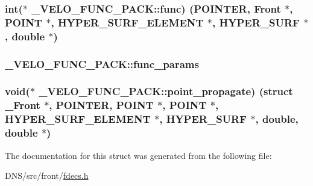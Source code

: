 \subsubsection[{\texorpdfstring{func}{func}}]{\setlength{\rightskip}{0pt plus 5cm}int($\ast$ \+\_\+\+V\+E\+L\+O\+\_\+\+F\+U\+N\+C\+\_\+\+P\+A\+C\+K\+::func) ({\bf P\+O\+I\+N\+T\+ER}, {\bf Front} $\ast$, {\bf P\+O\+I\+NT} $\ast$, {\bf H\+Y\+P\+E\+R\+\_\+\+S\+U\+R\+F\+\_\+\+E\+L\+E\+M\+E\+NT} $\ast$, {\bf H\+Y\+P\+E\+R\+\_\+\+S\+U\+RF} $\ast$, double $\ast$)}\hypertarget{struct___v_e_l_o___f_u_n_c___p_a_c_k_a6c439631360f812cfd623b2e4669c785}{}\label{struct___v_e_l_o___f_u_n_c___p_a_c_k_a6c439631360f812cfd623b2e4669c785}
\subsubsection[{\texorpdfstring{func\+\_\+params}{func_params}}]{ \+\_\+\+V\+E\+L\+O\+\_\+\+F\+U\+N\+C\+\_\+\+P\+A\+C\+K\+::func\+\_\+params}\hypertarget{struct___v_e_l_o___f_u_n_c___p_a_c_k_a47fdc170d348b8a0e417d182c31ad2b4}{}\label{struct___v_e_l_o___f_u_n_c___p_a_c_k_a47fdc170d348b8a0e417d182c31ad2b4}
\subsubsection[{\texorpdfstring{point\+\_\+propagate}{point_propagate}}]{\setlength{\rightskip}{0pt plus 5cm}void($\ast$ \+\_\+\+V\+E\+L\+O\+\_\+\+F\+U\+N\+C\+\_\+\+P\+A\+C\+K\+::point\+\_\+propagate) (struct {\bf \+\_\+\+Front} $\ast$, {\bf P\+O\+I\+N\+T\+ER}, {\bf P\+O\+I\+NT} $\ast$, {\bf P\+O\+I\+NT} $\ast$, {\bf H\+Y\+P\+E\+R\+\_\+\+S\+U\+R\+F\+\_\+\+E\+L\+E\+M\+E\+NT} $\ast$, {\bf H\+Y\+P\+E\+R\+\_\+\+S\+U\+RF} $\ast$, double, double $\ast$)}\hypertarget{struct___v_e_l_o___f_u_n_c___p_a_c_k_aff697b804ce3573e2ace18027763606c}{}\label{struct___v_e_l_o___f_u_n_c___p_a_c_k_aff697b804ce3573e2ace18027763606c}


The documentation for this struct was generated from the following file\+:\begin{DoxyCompactItemize}
\item 
D\+N\+S/src/front/\hyperlink{fdecs_8h}{fdecs.\+h}\end{DoxyCompactItemize}
